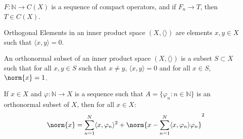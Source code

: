             $F:\mathbb{N}\rightarrow{C(X)}$ is a sequence of
            compact operators, and if $F_{n}\rightarrow{T}$,
            then $T\in{C(X)}$.
            \begin{definition}
                Orthogonal Elements in an inner product
                space $(X,\langle\rangle)$ are elements
                $x,y\in{X}$ such that
                $\langle{x,y}\rangle=0$.
            \end{definition}
            \begin{definition}
                An orthonormal subset of an inner
                product space $(X,\langle\rangle)$
                is a subset $S\subset{X}$ such that for
                all $x,y\in{S}$ such that $x\ne{y}$,
                $\langle{x,y}\rangle=0$ and for all
                $x\in{S}$, $\norm{x}=1$.
            \end{definition}
            \begin{theorem}
                If $x\in{X}$ and
                $\varphi:\mathbb{N}\rightarrow{X}$
                is a sequence such that
                $A=\{\varphi_{n}:n\in\mathbb{N}\}$ is an
                orthonormal subset of $X$, then for all
                $x\in{X}$:
                \begin{equation*}
                    \norm{x}=
                    \sum_{n=1}^{N}\langle{x,\varphi_{n}}
                    \rangle^{2}
                    +\norm{x-\sum_{n=1}^{N}
                           \langle{x,\varphi_{n}}\rangle
                           \varphi_{n}}^{2}
                \end{equation*}
            \end{theorem}
